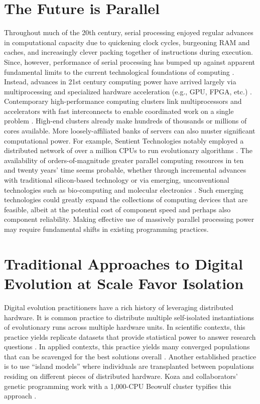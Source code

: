 \section{The Future is Parallel}

Throughout much of the 20th century, serial processing enjoyed regular advances in computational capacity due to quickening clock cycles, burgeoning RAM and caches, and increasingly clever packing together of instructions during execution.
Since, however, performance of serial processing has bumped up against apparent fundamental limits to the current technological foundations of computing \citep{sutter2005free}.
Instead, advances in 21st century computing power have arrived largely via multiprocessing \citep[p.~55]{hennessy2011computer} and specialized hardware acceleration (e.g., GPU, FPGA, etc.) \citep{che2008accelerating}.
Contemporary high-performance computing clusters link multiprocessors and accelerators with fast interconnects to enable coordinated work on a single problem \citep[p.~436]{hennessy2011computer}.
High-end clusters already make hundreds of thousands or millions of cores available.
More loosely-affiliated banks of servers can also muster significant computational power.
For example, Sentient Technologies notably employed a distributed network of over a million CPUs to run evolutionary algorithms \citep{miikkulainen2019evolving}.
The availability of orders-of-magnitude greater parallel computing resources in ten and twenty years’ time seems probable, whether through incremental advances with traditional silicon-based technology \citep{gropp2013programming,dongarra2014applied} or via emerging, unconventional technologies such as bio-computing \citep{benenson2009biocomputers} and molecular electronics \citep{xiang2016molecular}.
Such emerging technologies could greatly expand the collections of computing devices that are feasible, albeit at the potential cost of component speed \citep{bonnet2013amplifying, ellenbogen2000architectures} and perhaps also component reliability.
Making effective use of massively parallel processing power may require fundamental shifts in existing programming practices.

\section{Traditional Approaches to Digital Evolution at Scale Favor Isolation}

Digital evolution practitioners have a rich history of leveraging distributed hardware.
It is common practice to distribute multiple self-isolated instantiations of evolutionary runs across multiple hardware units.
In scientific contexts, this practice yields replicate datasets that provide statistical power to answer research questions \citep{dolson2017spatial}.
In applied contexts, this practice yields many converged populations that can be scavenged for the best solutions overall \citep{hornby2006automated}.
Another established practice is to use ``island models'' where individuals are transplanted between populations residing on different pieces of distributed hardware.
Koza and collaborators’ genetic programming work with a 1,000-CPU Beowulf cluster typifies this approach \citep{bennett1999building}.

